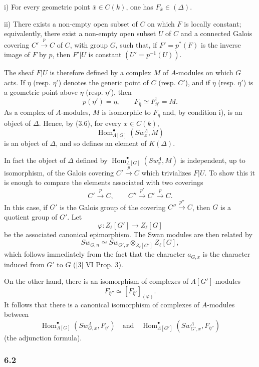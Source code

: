 \documentclass[11pt]{article}
\DeclareMathOperator{\Hom}{Hom}
\providecommand{\Hom}{\operatorname{Hom}}
\providecommand{\Hom}{\operatorname{Hom}}
\begin{document}
i) For every geometric point $\bar x\in C(k)$, one has $F_{\bar x}\in(\Delta)$.

ii) There exists a non-empty open subset of $C$ on which $F$ is locally constant; equivalently, there exist a non-empty open subset $U$ of $C$ and a connected Galois covering $C'\xrightarrow{p}C$ of $C$, with group $G$, such that, if $F'=p^*(F)$ is the inverse image of $F$ by $p$, then $F'|U$ is constant $(U'=p^{-1}(U))$.

The sheaf $F|U$ is therefore defined by a complex $M$ of $A$-modules on which $G$ acts. If $\eta$ (resp. $\eta'$) denotes the generic point of $C$ (resp. $C'$), and if $\bar\eta$ (resp. $\bar\eta'$) is a geometric point above $\eta$ (resp. $\eta'$), then
\[
p(\eta')=\eta,\qquad
F_{\bar\eta}\simeq F^{!}_{\bar\eta'}=M.
\tag{6.1.1}
\]
As a complex of $A$-modules, $M$ is isomorphic to $F_{\bar\eta}$ and, by condition i), is an object of $\Delta$. Hence, by (3.6), for every $x\in C(k)$,
\[
\Hom^\bullet_{\Lambda[G]}(Sw_x^\Lambda,M)
\]
is an object of $\Delta$, and so defines an element of $K(\Delta)$.

In fact the object of $\Delta$ defined by $\Hom^\bullet_{\Lambda[G]}(Sw_x^\Lambda,M)$ is independent, up to isomorphism, of the Galois covering $C'\xrightarrow{p}C$ which trivializes $F|U$. To show this it is enough to compare the elements associated with two coverings
\[
C'\xrightarrow{p}C,\qquad C''\xrightarrow{p'}C'\xrightarrow{p}C.
\]
In this case, if $G'$ is the Galois group of the covering $C''\xrightarrow{p''}C$, then $G$ is a quotient group of $G'$. Let
\[
\varphi:Z_\ell[G']\longrightarrow Z_\ell[G]
\]
be the associated canonical epimorphism. The Swan modules are then related by
\[
Sw_{G,n}\simeq Sw_{G',x}\otimes_{Z_\ell[G']}Z_\ell[G],
\]
which follows immediately from the fact that the character $a_{G,x}$ is the character induced from $G'$ to $G$ ([3] VI Prop. 3).

On the other hand, there is an isomorphism of complexes of $A[G']$-modules
\[
F_{\bar\eta''}\simeq [F_{\bar\eta'}]_{(\varphi)}.
\]
It follows that there is a canonical isomorphism of complexes of $A$-modules between
\[
\Hom^\bullet_{\Lambda[G]}(Sw_{G,x}^\Lambda,F_{\bar\eta'})
\quad\text{and}\quad
\Hom^\bullet_{\Lambda[G']}(Sw_{G',x}^\Lambda,F_{\bar\eta''})
\]
(the adjunction formula).

\subsubsection*{6.2}
\end{document}
